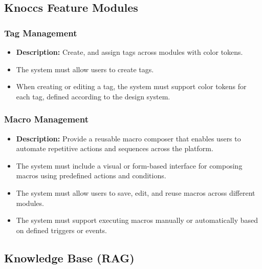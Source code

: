 \subsection{Knoccs Feature Modules}

\subsubsection{Tag Management}
\begin{itemize}
    \item \textbf{Description:} Create, and assign tags across modules with color tokens.
    \item The system must allow users to create tags.
    \item When creating or editing a tag, the system must support color tokens for each tag, defined according to the design system.
\end{itemize}

\subsubsection{Macro Management}
\begin{itemize}
    \item \textbf{Description:} Provide a reusable macro composer that enables users to automate repetitive actions and sequences across the platform.
    \item The system must include a visual or form-based interface for composing macros using predefined actions and conditions.
    \item The system must allow users to save, edit, and reuse macros across different modules.
    \item The system must support executing macros manually or automatically based on defined triggers or events.
\end{itemize}

\subsection{Knowledge Base (RAG)}

